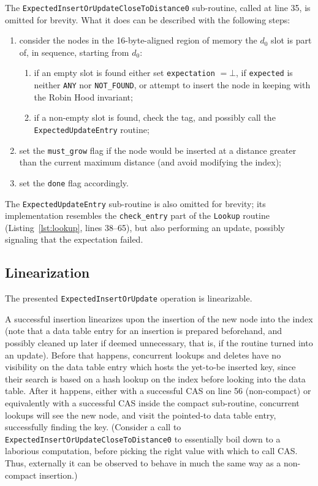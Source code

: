 The \texttt{ExpectedInsertOrUpdateCloseToDistance0} sub-routine, called at line 35, is omitted for brevity.
What it does can be described with the following steps:
\begin{enumerate}
	\item consider the nodes in the 16-byte-aligned region of memory the $d_0$ slot is part of, in sequence, starting from $d_0$:
	\begin{enumerate}
		\item if an empty slot is found either set \texttt{expectation} $=\bot$, if \texttt{expected} is neither \texttt{ANY} nor \texttt{{NOT\_FOUND}}, or attempt to insert the node in keeping with the Robin Hood invariant;
		\item if a non-empty slot is found, check the tag, and possibly call the \texttt{ExpectedUpdateEntry} routine;
	\end{enumerate}
	\item set the \texttt{{must\_grow}} flag if the node would be inserted at a distance greater than the current maximum distance (and avoid modifying the index);
	\item set the \texttt{done} flag accordingly.
\end{enumerate}

The \texttt{ExpectedUpdateEntry} sub-routine is also omitted for brevity; its implementation resembles the \texttt{{check\_entry}} part of the \texttt{Lookup} routine (Listing~\ref{lst:lookup}, lines 38--65), but also performing an update, possibly signaling that the expectation failed.




\subsection{Linearization}\label{subsec:insert-linearization}

The presented \texttt{ExpectedInsertOrUpdate} operation is linearizable.

A successful insertion linearizes upon the insertion of the new node into the index (note that a data table entry for an insertion is prepared beforehand, and possibly cleaned up later if deemed unnecessary, that is, if the routine turned into an update).
Before that happens, concurrent lookups and deletes have no visibility on the data table entry which hosts the yet-to-be inserted key, since their search is based on a hash lookup on the index before looking into the data table.
After it happens, either with a successful CAS on line 56 (non-compact) or equivalently with a successful CAS inside the compact sub-routine, concurrent lookups will see the new node, and visit the pointed-to data table entry, successfully finding the key.
(Consider a call to \texttt{ExpectedInsertOrUpdateCloseToDistance0} to essentially boil down to a laborious computation, before picking the right value with which to call CAS\@.
Thus, externally it can be observed to behave in much the same way as a non-compact insertion.)

